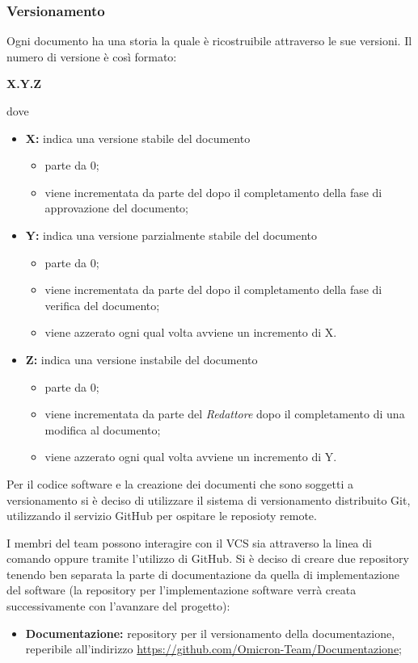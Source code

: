 \subsubsection{Versionamento}
Ogni documento ha una storia la quale è ricostruibile attraverso le sue versioni. Il numero di versione è così formato:
\begin{center}
\textbf{X.Y.Z}
\end{center}
dove
\begin{itemize}
 \item \textbf{X:} indica una versione stabile del documento
 	\begin{itemize}
 		\item parte da 0;
 		\item viene incrementata da parte del \respProg{} dopo il completamento della fase di approvazione del documento;
 	\end{itemize}
 \item \textbf{Y:}  indica una versione parzialmente stabile del documento
 	\begin{itemize}
 		\item parte da 0;
 		\item viene incrementata da parte del \verifProg{} dopo il completamento della fase di verifica del documento;
 		\item viene azzerato ogni qual volta avviene un incremento di X.
 	\end{itemize}
 \item \textbf{Z:} indica una versione instabile del documento
 \begin{itemize}
 		\item parte da 0;
 		\item viene incrementata da parte del \emph{Redattore} dopo il completamento di una modifica al documento;
 		\item viene azzerato ogni qual volta avviene un incremento di Y.
 	\end{itemize}
\end{itemize}

Per il codice software e la creazione dei documenti che sono soggetti a versionamento si è deciso di utilizzare il sistema di versionamento distribuito Git, utilizzando il servizio GitHub per ospitare le reposioty remote.


I membri del team \Omicron{} possono interagire con il VCS sia attraverso la linea di comando oppure tramite l'utilizzo di GitHub. Si è deciso di creare due repository tenendo ben separata la parte di documentazione da quella di implementazione del software (la repository per l'implementazione software verrà creata successivamente con l'avanzare del progetto):
\begin{itemize}
 \item \textbf{Documentazione:} repository per il versionamento della documentazione, reperibile all'indirizzo \url{https://github.com/Omicron-Team/Documentazione};
\end{itemize}

